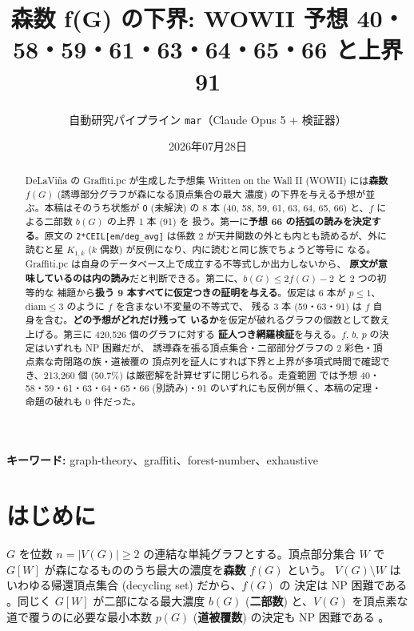 \documentclass[paper=a4,fontsize=10.5pt,jafontsize=10.5pt]{jlreq}
\title{森数 f(G) の下界: WOWII 予想 40・58・59・61・63・64・65・66 と上界 91}
\author{自動研究パイプライン \texttt{mar}（Claude Opus 5 + 検証器）}
\date{2026年07月28日}
\theoremstyle{plain}
\theoremstyle{definition}
\begin{document}
\maketitle

\begin{abstract}
DeLaViña の Graffiti.pc が生成した予想集 Written on the Wall II (WOWII)
\cite{wowii} には\textbf{森数} $f(G)$ (誘導部分グラフが森になる頂点集合の最大
濃度) の下界を与える予想が並ぶ。本稿はそのうち状態が \texttt{O} (未解決) の 8 本
(40, 58, 59, 61, 63, 64, 65, 66) と、$f$ による二部数 $b(G)$ の上界 1 本 (91) を
扱う。第一に\textbf{予想 66 の括弧の読みを決定する}。原文の
\texttt{2*CEIL[em/deg\_avg]} は係数 $2$ が天井関数の外とも内とも読めるが、外に
読むと星 $K_{1,k}$ ($k$ 偶数) が反例になり、内に読むと同じ族でちょうど等号に
なる。Graffiti.pc は自身のデータベース上で成立する不等式しか出力しないから、
\textbf{原文が意味しているのは内の読み}だと判断できる。第二に、$b(G) \le 2f(G) - 2$ と 2 つの初等的な
補題から\textbf{扱う 9 本すべてに仮定つきの証明を与える}。仮定は 6 本が
$p \le 1$、$\mathrm{diam} \le 3$ のように $f$ を含まない不変量の不等式で、
残る 3 本 (59・63・91) は $f$ 自身を含む。\textbf{どの予想がどれだけ残って
いるか}を仮定が破れるグラフの個数として数え上げる。第三に 420,526 個のグラフに対する
\textbf{証人つき網羅検証}を与える。$f$, $b$, $p$ の決定はいずれも NP 困難だが、
誘導森を張る頂点集合・二部部分グラフの $2$ 彩色・頂点素な奇閉路の族・道被覆の
頂点列を証人にすれば下界と上界が多項式時間で確認でき、213,260 個 (50.7\%) は厳密解を計算せずに閉じられる。走査範囲
では予想 40・58・59・61・63・64・65・66 (別読み)・91 のいずれにも反例が無く、本稿の定理・命題の破れも
0 件だった。
\end{abstract}

\noindent\textbf{キーワード:} graph-theory、graffiti、forest-number、exhaustive


\section{はじめに}\label{sec:intro}

$G$ を位数 $n = |V(G)| \ge 2$ の連結な単純グラフとする。頂点部分集合 $W$ で
$G[W]$ が森になるもののうち最大の濃度を\textbf{森数} $f(G)$ という。
$V(G) \setminus W$ はいわゆる帰還頂点集合 (decycling set) だから、$f(G)$ の
決定は NP 困難である \cite{karp1972}。同じく $G[W]$ が二部になる最大濃度
$b(G)$ (\textbf{二部数}) と、$V(G)$ を頂点素な道で覆うのに必要な最小本数
$p(G)$ (\textbf{道被覆数}) の決定も NP 困難である \cite{gj1979}。
\end{document}
